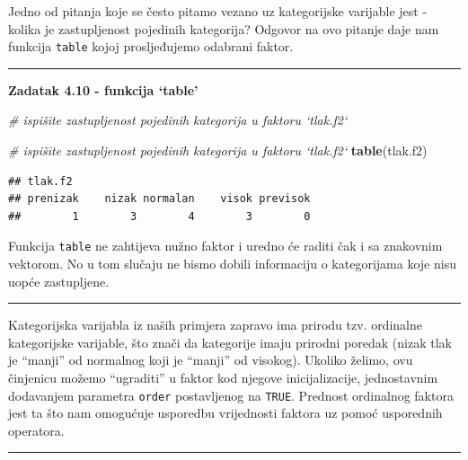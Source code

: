 \documentclass[]{book}
\newenvironment{Shaded}{\begin{snugshade}}{\end{snugshade}}
\newcommand{\KeywordTok}[1]{\textcolor[rgb]{0.13,0.29,0.53}{\textbf{#1}}}
\newcommand{\CommentTok}[1]{\textcolor[rgb]{0.56,0.35,0.01}{\textit{#1}}}
\newcommand{\NormalTok}[1]{#1}
\theoremstyle{definition}
\theoremstyle{definition}
\theoremstyle{definition}
\theoremstyle{remark}
\begin{document}
Jedno od pitanja koje se često pitamo vezano uz kategorijske varijable
jest - kolika je zastupljenost pojedinih kategorija? Odgovor na ovo
pitanje daje nam funkcija \texttt{table} kojoj prosljeđujemo odabrani
faktor.

\begin{center}\rule{0.5\linewidth}{\linethickness}\end{center}

\textbf{Zadatak 4.10 - funkcija `table'}

\begin{Shaded}
\begin{Highlighting}[]
\CommentTok{# ispišite zastupljenost pojedinih kategorija u faktoru `tlak.f2`}
\end{Highlighting}
\end{Shaded}

\begin{Shaded}
\begin{Highlighting}[]
\CommentTok{# ispišite zastupljenost pojedinih kategorija u faktoru `tlak.f2`}
\KeywordTok{table}\NormalTok{(tlak.f2)}
\end{Highlighting}
\end{Shaded}

\begin{verbatim}
## tlak.f2
## prenizak    nizak normalan    visok previsok 
##        1        3        4        3        0
\end{verbatim}

Funkcija \texttt{table} ne zahtijeva nužno faktor i uredno će raditi čak
i sa znakovnim vektorom. No u tom slučaju ne bismo dobili informaciju o
kategorijama koje nisu uopće zastupljene.

\begin{center}\rule{0.5\linewidth}{\linethickness}\end{center}

Kategorijska varijabla iz naših primjera zapravo ima prirodu tzv.
ordinalne kategorijske varijable, što znači da kategorije imaju prirodni
poredak (nizak tlak je ``manji'' od normalnog koji je ``manji'' od
visokog). Ukoliko želimo, ovu činjenicu možemo ``ugraditi'' u faktor kod
njegove inicijalizacije, jednostavnim dodavanjem parametra
\texttt{order} postavljenog na \texttt{TRUE}. Prednost ordinalnog
faktora jest ta što nam omogućuje usporedbu vrijednosti faktora uz pomoć
usporednih operatora.

\begin{center}\rule{0.5\linewidth}{\linethickness}\end{center}
\end{document}
